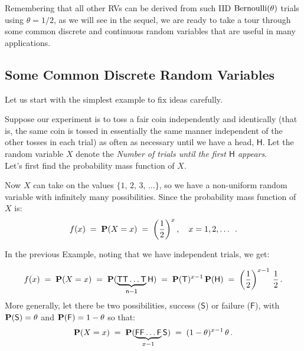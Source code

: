 Remembering that all other RVs can be derived from such IID $\mbox{{\rm Bernoulli}}(\theta)$ trials using $\theta=1/2$, as we will see in the sequel, 
we are ready to take a tour through some common discrete and continuous random variables that are useful in many applications.
 
\subsection{Some Common Discrete Random Variables}\label{S:SomeCommonDiscreteRVs}

Let us start with the simplest example to fix ideas carefully.
\begin{example}\label{Ex:WaitinfFor1stHeads}
Suppose our experiment is to toss a fair coin independently and
  identically (that is, the same coin is tossed in essentially the same
  manner independent of the other tosses in each trial) as often as
  necessary until we have a head, $\mathsf{H}$.  Let the random
  variable
  $X$ denote the \emph{Number of trials until the first $\mathsf{H}$ appears}.\\[4pt]
Let's first find the probability mass function of $X$.

Now $X$ can take on the values
$\{1,\,2,\,3,\,\ldots\}$, so we  have a  non-uniform random
variable with infinitely many possibilities.  Since
the  probability mass function of $X$ is:
$$f(x)\; =\; \mathbf{P}(X=x)\;=\;\left(\frac{1}{2}\right)^x, \quad x=1,2,\dots \enspace.$$
\end{example}

\bigskip

In the previous Example, %
noting that we have independent trials, we get:

\[f(x)\; = \;\mathbf{P}(X=x)\;=\;\mathbf{P}(\mathsf{\underbrace{\mathsf{TT}\ldots\mathsf{T}}_{n-1}\mathsf{H}})\;=\; \mathbf{P}(\mathsf{T})^{x-1}\,\mathbf{P}(\mathsf{H})\;=\;
\left(\frac{1}{2}\right)^{x-1}\,\frac{1}{2}\,.\]
More generally, let there be two possibilities, success ($\mathsf{S}$) or failure
($\mathsf{F}$), with  $\mathbf{P}(\mathsf{S})=  \theta$  and \newline $\mathbf{P}(\mathsf{F})=1-\theta$ so that:
\[\mathbf{P}(X=x)\;=\;\mathbf{P}(\underbrace{\mathsf{F F} \ldots \mathsf{F}}_{x-1}\mathsf{S})\;=\; (1 - \theta)^{x-1}\, \theta\,.\]

